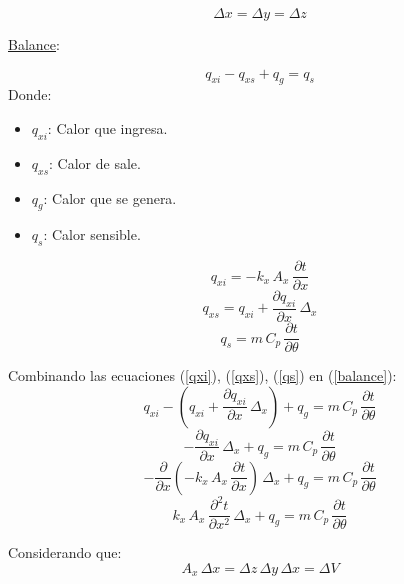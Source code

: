 \begin{equation*}
    \Delta x=\Delta y=\Delta z
\end{equation*}

\underline{Balance}:

\begin{equation}
    q_{xi}-q_{xs}+q_g=q_s
    \label{balance}
\end{equation}
Donde:
\begin{itemize}
    \item \emph{$q_{xi}$}: Calor que ingresa.
    \item \emph{$q_{xs}$}: Calor de sale.
    \item \emph{$q_g$}: Calor que se genera.
    \item \emph{$q_s$}: Calor sensible.
\end{itemize}

\begin{equation}
    q_{xi}=-k_x\,A_x\,\frac{\partial t}{\partial x}
    \label{qxi}
\end{equation}
\begin{equation}
    q_{xs}=q_{xi}+\frac{\partial q_{xi}}{\partial x}\,\Delta_x
    \label{qxs}
\end{equation}
\begin{equation}
    q_s=m\,C_p\,\frac{\partial t}{\partial\theta}
    \label{qs}
\end{equation}

Combinando las ecuaciones (\ref{qxi}), (\ref{qxs}), (\ref{qs}) en
(\ref{balance}):
\begin{equation*}
    q_{xi}-\left(q_{xi}+\frac{\partial q_{xi}}{\partial x}\,\Delta_x\right)+q_g
    =m\,C_p\,\frac{\partial t}{\partial\theta}
\end{equation*}
\begin{equation*}
    -\frac{\partial q_{xi}}{\partial x}\,\Delta_x+q_g
    =m\,C_p\,\frac{\partial t}{\partial\theta}
\end{equation*}
\begin{equation*}
    -\frac{\partial}{\partial x}
    \left(-k_x\,A_x\,\frac{\partial t}{\partial x}\right)\,\Delta_x+q_g
    =m\,C_p\,\frac{\partial t}{\partial\theta}
\end{equation*}
\begin{equation*}
    k_x\,A_x\,\frac{\partial^{2}t}{\partial x^2}\,\Delta_x+q_g
    =m\,C_p\,\frac{\partial t}{\partial\theta}
\end{equation*}

Considerando que:
\begin{equation*}
    A_x\,\Delta x=\Delta z\,\Delta y\,\Delta x=\Delta V
\end{equation*}

